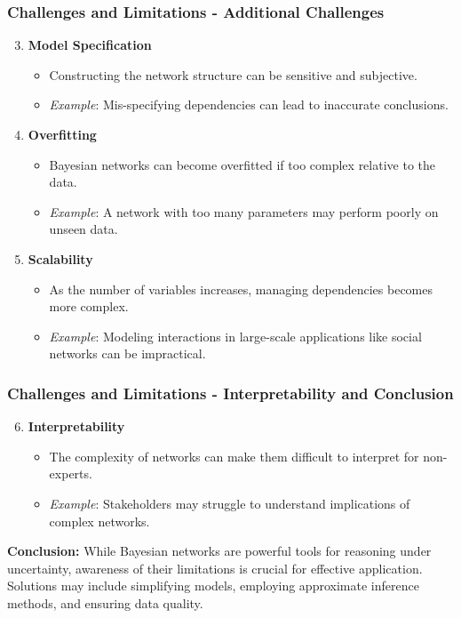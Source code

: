 \documentclass[aspectratio=169]{beamer}
\begin{document}
\begin{frame}[fragile]
    \frametitle{Challenges and Limitations - Additional Challenges}
    \begin{enumerate}
        \setcounter{enumi}{2}
        \item \textbf{Model Specification} 
        \begin{itemize}
            \item Constructing the network structure can be sensitive and subjective.
            \item \textit{Example}: Mis-specifying dependencies can lead to inaccurate conclusions.
        \end{itemize}
        
        \item \textbf{Overfitting} 
        \begin{itemize}
            \item Bayesian networks can become overfitted if too complex relative to the data.
            \item \textit{Example}: A network with too many parameters may perform poorly on unseen data.
        \end{itemize}
        
        \item \textbf{Scalability} 
        \begin{itemize}
            \item As the number of variables increases, managing dependencies becomes more complex.
            \item \textit{Example}: Modeling interactions in large-scale applications like social networks can be impractical.
        \end{itemize}
    \end{enumerate}
\end{frame}

\begin{frame}[fragile]
    \frametitle{Challenges and Limitations - Interpretability and Conclusion}
    \begin{enumerate}
        \setcounter{enumi}{5}
        \item \textbf{Interpretability} 
        \begin{itemize}
            \item The complexity of networks can make them difficult to interpret for non-experts.
            \item \textit{Example}: Stakeholders may struggle to understand implications of complex networks.
        \end{itemize}
    \end{enumerate}
    
    \vspace{1em}
    \textbf{Conclusion:} While Bayesian networks are powerful tools for reasoning under uncertainty, awareness of their limitations is crucial for effective application. Solutions may include simplifying models, employing approximate inference methods, and ensuring data quality.
\end{frame}
\end{document}
